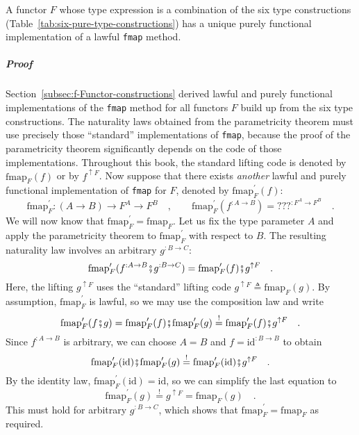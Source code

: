 A functor $F$ whose type expression is a combination of the six type
constructions (Table~\ref{tab:six-pure-type-constructions}) has
a unique purely functional implementation of a lawful \lstinline!fmap!
method. 

\subparagraph{Proof}

Section~\ref{subsec:f-Functor-constructions} derived lawful and
purely functional implementations of the \lstinline!fmap! method
for all functors $F$ build up from the six type constructions. The
naturality laws obtained from the parametricity theorem must use precisely
those ``standard'' implementations of \lstinline!fmap!, because
the proof of the parametricity theorem significantly depends on the
code of those implementations. Throughout this book, the standard
lifting code is denoted by $\text{fmap}_{F}(f)$ or by $f^{\uparrow F}$.
Now suppose that there exists \emph{another} lawful and purely functional
implementation of \lstinline!fmap! for $F$, denoted by $\text{fmap}_{F}^{\prime}(f)$:
\[
\text{fmap}_{F}^{\prime}:\left(A\rightarrow B\right)\rightarrow F^{A}\rightarrow F^{B}\quad,\quad\quad\text{fmap}_{F}^{\prime}(f^{:A\rightarrow B})=\text{???}^{:F^{A}\rightarrow F^{B}}\quad.
\]
We will now know that $\text{fmap}_{F}^{\prime}=\text{fmap}_{F}$.
Let us fix the type parameter $A$ and apply the parametricity theorem
to $\text{fmap}_{F}^{\prime}$ with respect to $B$. The resulting
naturality law involves an arbitrary $g^{:B\rightarrow C}$:
\[
\text{fmap}_{F}^{\prime}(f^{:A\rightarrow B}\bef g^{:B\rightarrow C})=\text{fmap}_{F}^{\prime}(f)\bef g^{\uparrow F}\quad.
\]
Here, the lifting $g^{\uparrow F}$ uses the ``standard'' lifting
code $g^{\uparrow F}\triangleq\text{fmap}_{F}(g)$. By assumption,
$\text{fmap}_{F}^{\prime}$ is lawful, so we may use the composition
law and write
\[
\text{fmap}_{F}^{\prime}(f\bef g)=\text{fmap}_{F}^{\prime}(f)\bef\text{fmap}_{F}^{\prime}(g)\overset{!}{=}\text{fmap}_{F}^{\prime}(f)\bef g^{\uparrow F}\quad.
\]
Since $f^{:A\rightarrow B}$ is arbitrary, we can choose $A=B$ and
$f=\text{id}^{:B\rightarrow B}$ to obtain
\[
\text{fmap}_{F}^{\prime}(\text{id})\bef\text{fmap}_{F}^{\prime}(g)\overset{!}{=}\text{fmap}_{F}^{\prime}(\text{id})\bef g^{\uparrow F}\quad.
\]
By the identity law, $\text{fmap}_{F}^{\prime}(\text{id})=\text{id}$,
so we can simplify the last equation to
\[
\text{fmap}_{F}^{\prime}(g)\overset{!}{=}g^{\uparrow F}=\text{fmap}_{F}(g)\quad.
\]
This must hold for arbitrary $g^{:B\rightarrow C}$, which shows that
$\text{fmap}_{F}^{\prime}=\text{fmap}_{F}$ as required.

